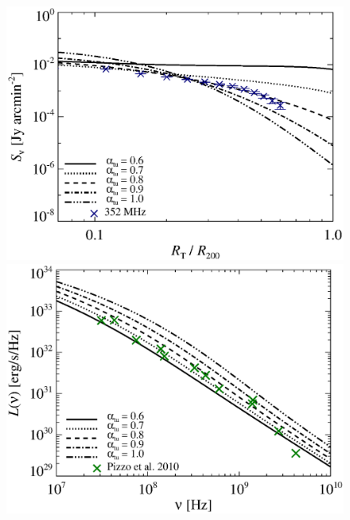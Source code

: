 \documentclass[a4paper,fleqn,usenatbib]{mnras}
\newcommand{\Mflatturb}{{\it M-turbulence}\xspace}
\begin{document}
\begin{figure}
\\
\begin{minipage}{1\columnwidth}
  \begin{center}%
    \includegraphics[width=\columnwidth]{prof.comp.KrTTDth.aI0.eps}
  \end{center}
\end{minipage}
\begin{minipage}{1\columnwidth}
   \begin{center}%
     \includegraphics[width=\columnwidth]{spec.comp.KrTTDth.aI0.eps}
   \end{center}
\end{minipage}

\end{figure}
\end{document}
